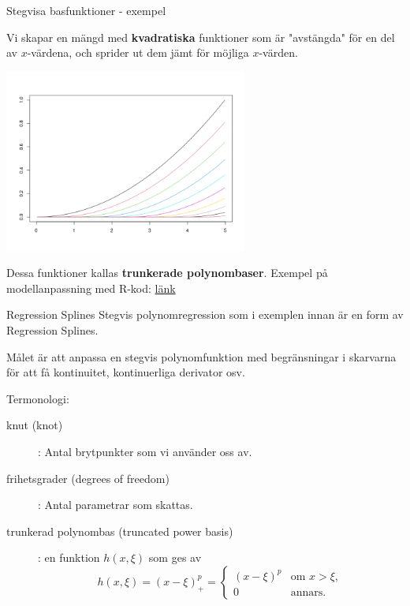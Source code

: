 \documentclass[10pt,english]{beamer}
\begin{document}
\begin{frame}{Stegvisa basfunktioner - exempel}

Vi skapar en mängd med \textbf{kvadratiska} funktioner som är "avstängda" för en del av $x$-värdena, 
och sprider ut dem jämt för möjliga $x$-värden.

\includegraphics[width=0.6\textwidth]{figs/quad_trunc_power_basis.png}


Dessa funktioner kallas \textbf{trunkerade polynombaser}. 
Exempel på modellanpassning med R-kod: \href{https://raw.githubusercontent.com/STIMALiU/732G57_ML/refs/heads/main/labs/trunkerade_polynombaser_exempel.R}{länk}

\end{frame}


\begin{frame}{Regression Splines}
    Stegvis polynomregression som i exemplen innan är en form av Regression Splines.

    \begin{bluebox}
    Målet är att anpassa en stegvis polynomfunktion med begränsningar i skarvarna för att få kontinuitet, kontinuerliga derivator osv.
    \end{bluebox}

    Termonologi:
    \begin{description}
        \item[knut (knot)]: Antal brytpunkter som vi använder oss av.
        \item[frihetsgrader (degrees of freedom)]: Antal parametrar som skattas.
        \item[trunkerad polynombas (truncated power basis)]: en funktion $h(x,\xi)$ som ges av
        \begin{equation*}
            h(x,\xi) = (x - \xi)^p_+ = \begin{cases}
                (x - \xi)^p & \text{om } x > \xi, \\
                0 & \text{annars.}
            \end{cases}
        \end{equation*} 
    \end{description}
\end{frame}
\end{document}
